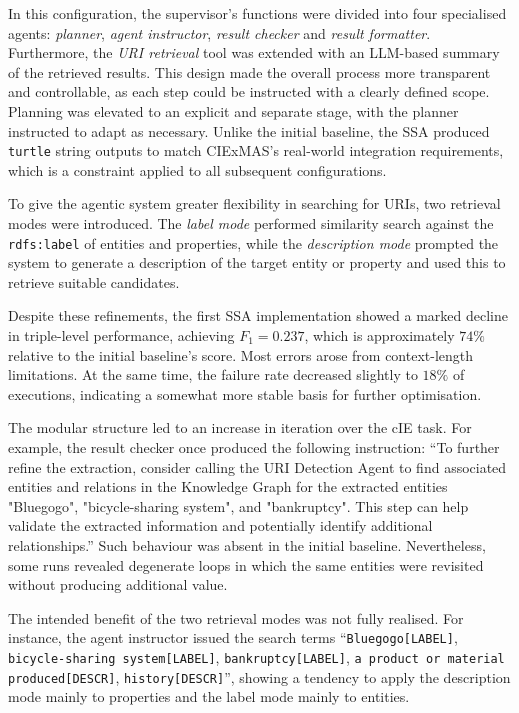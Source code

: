 \documentclass[a4paper,oneside,bibliography=totoc]{scrbook}
\begin{document}
In this configuration, the supervisor’s functions were divided into four specialised agents: \textit{planner}, \textit{agent instructor}, \textit{result checker} and \textit{result formatter}. Furthermore, the \textit{URI retrieval} tool was extended with an \ac{LLM}-based summary of the retrieved results. This design made the overall process more transparent and controllable, as each step could be instructed with a clearly defined scope. Planning was elevated to an explicit and separate stage, with the planner instructed to adapt as necessary. Unlike the initial baseline, the \ac{SSA} produced \texttt{turtle} string outputs to match CIExMAS’s real-world integration requirements, which is a constraint applied to all subsequent configurations.

To give the agentic system greater flexibility in searching for URIs, two retrieval modes were introduced. The \textit{label mode} performed similarity search against the \texttt{rdfs:label} of entities and properties, while the \textit{description mode} prompted the system to generate a description of the target entity or property and used this to retrieve suitable candidates.

Despite these refinements, the first \ac{SSA} implementation showed a marked decline in triple-level performance, achieving $F_{1}=0.237$, which is approximately \(74\%\) relative to the initial baseline’s score. Most errors arose from context-length limitations. At the same time, the failure rate decreased slightly to \(18\%\) of executions, indicating a somewhat more stable basis for further optimisation.

The modular structure led to an increase in iteration over the \ac{cIE} task. For example, the result checker once produced the following instruction: \enquote{To further refine the extraction, consider calling the URI Detection Agent to find associated entities and relations in the Knowledge Graph for the extracted entities "Bluegogo", "bicycle-sharing system", and "bankruptcy". This step can help validate the extracted information and potentially identify additional relationships.} Such behaviour was absent in the initial baseline. Nevertheless, some runs revealed degenerate loops in which the same entities were revisited without producing additional value.

The intended benefit of the two retrieval modes was not fully realised. For instance, the agent instructor issued the search terms \enquote{\texttt{Bluegogo[LABEL]}, \texttt{bicycle-sharing system[LABEL]}, \texttt{bankruptcy[LABEL]}, \texttt{a product or material produced[DESCR]}, \texttt{history[DESCR]}}, showing a tendency to apply the description mode mainly to properties and the label mode mainly to entities.
\end{document}
